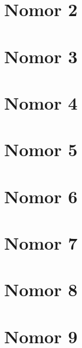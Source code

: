\documentclass[a4paper,12pt]{report}
\begin{document}
\section*{Nomor 2}

\section*{Nomor 3}

\section*{Nomor 4}

\section*{Nomor 5}

\section*{Nomor 6}

\section*{Nomor 7}

\section*{Nomor 8}


\section*{Nomor 9}


\end{document}
